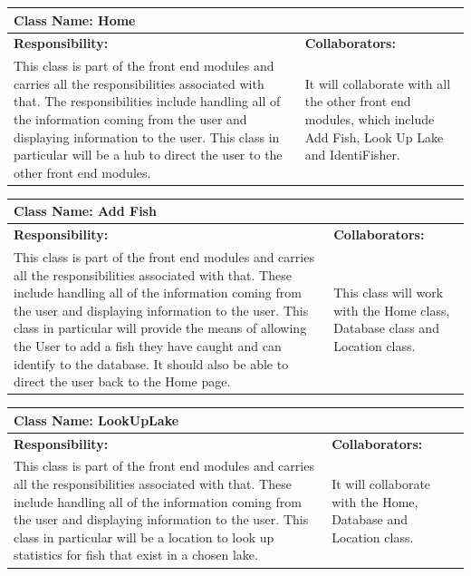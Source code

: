 \documentclass[]{article}
\begin{document}
	\begin{table}[ht]
		\centering
		\begin{tabular}{|p{5cm}|p{5cm}|}
		\hline
		 \multicolumn{2}{|l|}{\textbf{Class Name: Home}} \\
		\hline
		\textbf{Responsibility:} & \textbf{Collaborators:} \\ \hline
		 This class is part of the front end modules and carries all the responsibilities associated with that. The responsibilities include handling all of the information coming from the user and displaying information to the user. This class in particular will be a hub to direct the user to the other front end modules.

		 & It will collaborate with all the other front end modules, which include Add Fish, Look Up Lake and IdentiFisher.  \\
		\hline
		\end{tabular}
	\end{table}

	\begin{table}[ht]
		\centering
		\begin{tabular}{|p{5cm}|p{5cm}|}
		\hline
		 \multicolumn{2}{|l|}{\textbf{Class Name: Add Fish}} \\
		\hline
		\textbf{Responsibility:} & \textbf{Collaborators:} \\ \hline
		 This class is part of the front end modules and carries all the responsibilities associated with that. These include handling all of the information coming from the user and displaying information to the user. This class in particular will provide the means of allowing the User to add a fish they have caught and can identify to the database. It should also be able to direct the user back to the Home page. & This class will work with the Home class, Database class and Location class. \\
		\hline
		\end{tabular}
	\end{table}

	\begin{table}[ht]
		\centering
		\begin{tabular}{| p{5cm} | p{5cm} |}
		\hline
		 \multicolumn{2}{|l|}{\textbf{Class Name: LookUpLake}} \\
		\hline
		\textbf{Responsibility:} & \textbf{Collaborators:} \\ \hline
		This class is part of the front end modules and carries all the responsibilities associated with that. These include handling all of the information coming from the user and displaying information to the user. This class in particular will be a location to look up statistics for fish that exist in a chosen lake. & It will collaborate with the Home, Database and Location class.  \\
		\hline
		\end{tabular}
	\end{table}
\end{document}
